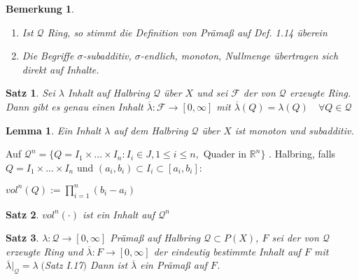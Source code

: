 \documentclass[11pt]{memoir}
\theoremstyle{changebreak}
\newtheorem{Bemerkung}{Bemerkung}[chapter]
\newtheorem{Lemma}{Lemma}[chapter]
\newtheorem{Satz}{Satz}[chapter]
\begin{document}
\begin{Bemerkung}
\begin{enumerate}
	\item Ist $\mathscr Q$ Ring, so stimmt die Definition von Prämaß auf \emph{Def. 1.14} überein
	\item Die Begriffe $\sigma$-subadditiv, $\sigma$-endlich, monoton, Nullmenge übertragen sich direkt auf Inhalte.
\end{enumerate}
\end{Bemerkung}

\begin{Satz}
Sei $\lambda$ Inhalt auf Halbring $\mathscr Q$ über $X$ und sei $\mathscr F$ der von $\mathscr Q$ erzeugte Ring. Dann gibt es genau einen Inhalt $\overline{\lambda}: \mathscr F \rightarrow [0, \infty]$ mit $\overline{\lambda}(Q) = \lambda(Q)\quad \forall Q \in \mathscr Q$
\end{Satz}


\begin{Lemma}
Ein Inhalt $\lambda$ auf dem Halbring $\mathscr Q$ über $X$ ist monoton und subadditiv.
\end{Lemma}

Auf $\mathscr Q^n = \{Q = I_1 \times ... \times I_n: I_i \in J, 1 \leq i \leq n, $ Quader in $\mathbb R^n \}$ .
Halbring, falls $Q = I_1 \times ... \times I_n$ und $(a_i, b_i) \subset I_i \subset [a_i, b_i]$:
\begin{center}
	$vol^n(Q) := \prod\limits_{i=1}^n (b_i - a_i)$
\end{center}

\begin{Satz}
$vol^n(\cdotp)$ ist ein Inhalt auf $\mathscr Q^n$
\end{Satz}

\begin{Satz}
$\lambda: \mathscr Q \rightarrow [0, \infty]$ Prämaß auf Halbring $\mathscr Q \subset P(X)$, $F$ sei der von $\mathscr Q$ erzeugte Ring und $\overline{\lambda}: F \rightarrow [0, \infty]$ der eindeutig bestimmte Inhalt auf $F$ mit $\overline{\lambda}|_\mathscr Q = \lambda \; ($Satz I.17$)$
Dann ist $\overline{\lambda}$ ein Prämaß auf $F$.
\end{Satz}
\end{document}
